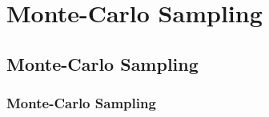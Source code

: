 \chapter{Monte-Carlo Sampling}
\label{chapter:monte_carlo}
\section{Monte-Carlo Sampling}
\label{section:monte_carlo}
\subsection{Monte-Carlo Sampling}
\label{subsection:monte_carlo}
\cite{jacobson2004hierarchical}

